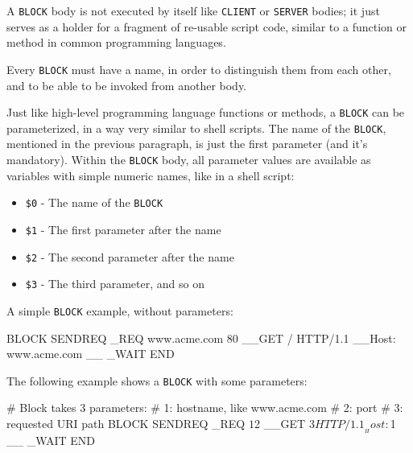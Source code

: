 A \texttt{BLOCK} body is not executed by itself like \texttt{CLIENT} or 
\texttt{SERVER} bodies; it just serves as a holder for a fragment of 
re-usable script code, similar to a function or method in common 
programming languages.

Every \texttt{BLOCK} must have a name, in order to distinguish them from 
each other, and to be able to be invoked from another body.

Just like high-level programming language functions or methods, 
a \texttt{BLOCK} can be parameterized, in a way 
very similar to shell scripts. The name of the \texttt{BLOCK}, mentioned 
in the previous paragraph, is just the first parameter (and it's 
mandatory). Within the \texttt{BLOCK} body, all parameter values are 
available as variables with simple numeric names, like in a shell script:

\begin{itemize}
  \item \texttt{\$0} - The name of the \texttt{BLOCK}
  \item \texttt{\$1} - The first parameter after the name
  \item \texttt{\$2} - The second parameter after the name
  \item \texttt{\$3} - The third parameter, and so on
\end{itemize}

A simple \texttt{BLOCK} example, without parameters:

\begin{usplisting}
    BLOCK SENDREQ
    _REQ www.acme.com 80
    __GET / HTTP/1.1
    __Host: www.acme.com
    __
    _WAIT
    END
\end{usplisting}

The following example shows a \texttt{BLOCK} with some parameters:

\begin{usplisting}
    # Block takes 3 parameters:
    # 1: hostname, like www.acme.com
    # 2: port
    # 3: requested URI path
    BLOCK SENDREQ
    _REQ $1 $2
    __GET $3 HTTP/1.1
    __Host: $1
    __
    _WAIT
    END
\end{usplisting}
